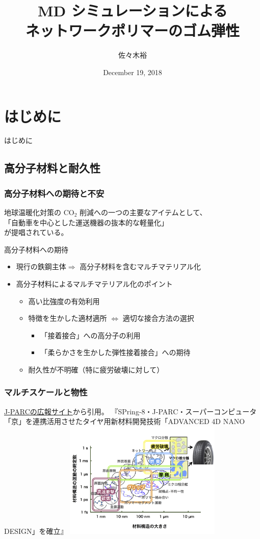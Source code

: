\documentclass[11pt, dvipdfmx]{beamer}
\title
[MD シミュレーションによるネットワークポリマーのゴム弾性]
{MD シミュレーションによる\\ネットワークポリマーのゴム弾性}
\author[東亞合成　佐々木、大村]{佐々木裕}
\institute[東亞合成]{東亞合成}
\date{December 19, 2018}
\begin{document}
\begin{frame}\frametitle{}
	\titlepage
\end{frame}
\section{はじめに}
\begin{frame}
\LARGE{はじめに}
\end{frame}
\subsection{高分子材料と耐久性}
\begin{frame}
\frametitle{高分子材料への期待と不安}
地球温暖化対策の CO$_2$ 削減への一つの主要なアイテムとして、\\
{\Large
{\color{red}「自動車を中心とした運送機器の抜本的な軽量化」}
}\\
が提唱されている。
\begin{block}{高分子材料への期待}
	\begin{itemize}
	\item
	現行の鉄鋼主体$ \Rightarrow$ 高分子材料を含むマルチマテリアル化
	
	\item
	高分子材料によるマルチマテリアル化のポイント
		\begin{itemize}
		\item
		高い比強度の有効利用
		\item
		特徴を生かした適材適所 $\Leftrightarrow$ 適切な接合方法の選択
			\Large
			\begin{itemize}
			\item
			{\color{red} 「接着接合」への高分子の利用}
			\item
			{\color{red} 「柔らかさを生かした弾性接着接合」への期待}
			\end{itemize}
		\item
		{\color{blue}耐久性が不明確（特に疲労破壊に対して）}
		\end{itemize}
	\end{itemize}
\end{block}
\end{frame}
\begin{frame}
\frametitle{マルチスケールと物性}
\href{http://j-parc.jp/ja/topics/2015/Pulse151112.html}{J-PARCの広報サイト}から引用。
\small
『SPring-8・J-PARC・スーパーコンピュータ「京」を連携活用させたタイヤ用新材料開発技術「ADVANCED 4D NANO DESIGN」を確立』
\centering
\includegraphics[width=75mm]{./fig/press151112_02.jpg}
\end{frame}
\end{document}
